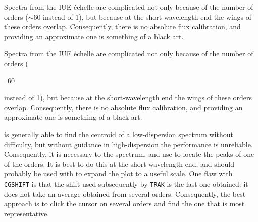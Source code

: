 \begin{latexonly}
Spectra from the IUE \'{e}chelle are complicated not only because of the number
of orders ($\sim 60$ instead of 1), but because at the short-wavelength end
the wings of these orders overlap. Consequently, there is no absolute flux
calibration, and providing an approximate one is something of a black art.
\end{latexonly}

\begin{htmlonly}
Spectra from the IUE \'{e}chelle are complicated not only because of the number
of orders (\begin{rawhtml}~60\end{rawhtml} instead of 1), but because at the
short-wavelength end the wings of these orders overlap. Consequently, there is
no absolute flux calibration, and providing an approximate one is something of
a black art.
\end{htmlonly}

 is generally able to find the centroid of a 
low-dispersion
spectrum without difficulty, but without guidance in high-dispersion the
performance is unreliable.  Consequently, it is necessary to 
 the
spectrum, and use  to locate the peaks of 
one of the orders.
It is best to do this at the short-wavelength end, and
 should probably be used with 
 to expand the plot to a useful scale.
One flaw with \verb+CGSHIFT+ is that the shift used subsequently by \verb+TRAK+
is the last one obtained: it does not take an average obtained from several
orders.  Consequently, the best approach is to click the cursor on several
orders and find the one that is most representative.

